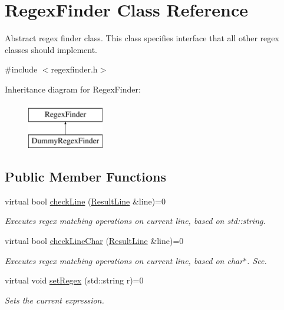 \hypertarget{class_regex_finder}{\section{Regex\-Finder Class Reference}
\label{class_regex_finder}
}


Abstract regex finder class. This class specifies interface that all other regex classes should implement.  




{\ttfamily \#include $<$regexfinder.\-h$>$}

Inheritance diagram for Regex\-Finder\-:\begin{figure}[H]
\begin{center}
\leavevmode
\includegraphics[height=2.000000cm]{class_regex_finder}
\end{center}
\end{figure}
\subsection*{Public Member Functions}
\begin{DoxyCompactItemize}
\item 
virtual bool \hyperlink{class_regex_finder_ab72d3c59f8eacf728a81c1229743aa8e}{check\-Line} (\hyperlink{class_result_line}{Result\-Line} \&line)=0
\begin{DoxyCompactList}\small\item\em Executes regex matching operations on current line, based on std\-::string. \end{DoxyCompactList}\item 
virtual bool \hyperlink{class_regex_finder_a4a22c2f90f8f87f5ac4d70b296d9b3e2}{check\-Line\-Char} (\hyperlink{class_result_line}{Result\-Line} \&line)=0
\begin{DoxyCompactList}\small\item\em Executes regex matching operations on current line, based on char$\ast$. See. \end{DoxyCompactList}\item 
virtual void \hyperlink{class_regex_finder_a7f98a20744f2074cff5dbd956ae832e4}{set\-Regex} (std\-::string r)=0
\begin{DoxyCompactList}\small\item\em Sets the current expression. \end{DoxyCompactList}\end{DoxyCompactItemize}


